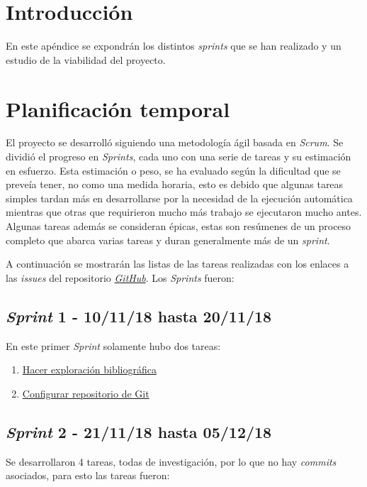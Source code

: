 
\section{Introducción}

En este apéndice se expondrán los distintos \textit{sprints} que se han realizado y un estudio de la viabilidad del proyecto.

\section{Planificación temporal}

El proyecto se desarrolló siguiendo una metodología ágil basada en \textit{Scrum}. Se dividió el progreso en \textit{Sprints}, cada uno con una serie de tareas y su estimación en esfuerzo. Esta estimación o peso, se ha evaluado según la dificultad que se preveía tener, no como una medida horaria, esto es debido que algunas tareas simples tardan más en desarrollarse por la necesidad de la ejecución automática mientras que otras que requirieron mucho más trabajo se ejecutaron mucho antes. Algunas tareas además se consideran épicas, estas son resúmenes de un proceso completo que abarca varias tareas y duran generalmente más de un \textit{sprint}. 

A continuación se mostrarán las listas de las tareas realizadas con los enlaces a las \textit{issues} del repositorio \textit{\href{https://github.com/jlgarridol/TFG-SmartBeds}{GitHub}}. Los \textit{Sprints} fueron:
\subsection{\textit{Sprint} 1 - 10/11/18 hasta 20/11/18}
En este primer \textit{Sprint} solamente hubo dos tareas:
\begin{enumerate}
	\item \href{https://github.com/joselucross/TFG-SmartBeds/issues/1}{Hacer exploración bibliográfica}
	\item \href{https://github.com/joselucross/TFG-SmartBeds/issues/2}{Configurar repositorio de Git}
\end{enumerate}
\subsection{\textit{Sprint} 2 - 21/11/18 hasta 05/12/18}
Se desarrollaron 4 tareas, todas de investigación, por lo que no hay \textit{commits} asociados, para esto las tareas fueron:

